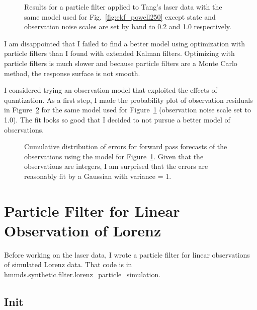 \documentclass[12pt]{article}
\newcommand{\filterplot}[2]{
\begin{figure}
  \centering
  \resizebox{1.0\textwidth}{!}{\texttt{[image: \#1\_plot.pdf]}}
  \caption{#2}
  \label{fig:#1}
\end{figure}
}
\begin{document}
\filterplot{pf_hand_noise}{Results for a particle filter applied to
  Tang's laser data with the same model used for
  Fig.~\ref{fig:ekf_powell250} except state and observation noise
  scales are set by hand to 0.2 and 1.0 respectively.}

I am disappointed that I failed to find a better model using
optimization with particle filters than I found with extended Kalman
filters.  Optimizing with particle filters is much slower and because
particle filters are a Monte Carlo method, the response surface is not
smooth.

I considered trying an observation model that exploited the effects of
quantization.  As a first step, I made the probability plot of
observation residuals in Figure~\ref{fig:cumulative} for the same
model used for Figure~\ref{fig:pf_hand_noise} (observation noise scale
set to 1.0).  The fit looks so good that I decided to not pursue a
better model of observations.

\begin{figure}
  \centering
    \caption{Cumulative distribution of errors for forward pass
      forecasts of the observations using the model for
      Figure~\ref{fig:pf_hand_noise}.  Given that the observations are
      integers, I am surprised that the errors are reasonably fit by a
      Gaussian with variance = 1.}
  \label{fig:cumulative}
\end{figure}

\FloatBarrier

\section{Particle Filter for Linear Observation of Lorenz}
\label{sec:linear_observation}

Before working on the laser data, I wrote a particle filter for linear
observations of simulated Lorenz data.  That code is in
hmmds.synthetic.filter.lorenz\_particle\_simulation.

\subsection{Init}
\label{sec:init}
\end{document}
